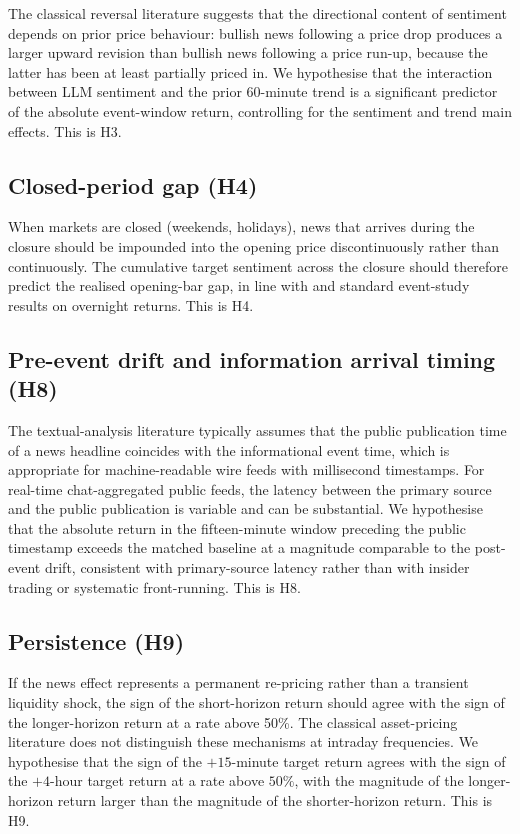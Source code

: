 The classical reversal literature \citep{tetlock2007giving} suggests
that the directional content of sentiment depends on prior price
behaviour: bullish news following a price drop produces a larger
upward revision than bullish news following a price run-up, because
the latter has been at least partially priced in. We hypothesise
that the interaction between LLM sentiment and the prior 60-minute
trend is a significant predictor of the absolute event-window
return, controlling for the sentiment and trend main effects. This
is H3.

\subsection{Closed-period gap (H4)}

When markets are closed (weekends, holidays), news that arrives
during the closure should be impounded into the opening price
discontinuously rather than continuously. The cumulative target
sentiment across the closure should therefore predict the realised
opening-bar gap, in line with \citet{fama1970efficient} and standard
event-study results on overnight returns. This is H4.

\subsection{Pre-event drift and information arrival timing (H8)}

The textual-analysis literature typically assumes that the public
publication time of a news headline coincides with the
informational event time, which is appropriate for
machine-readable wire feeds with millisecond timestamps. For
real-time chat-aggregated public feeds, the latency between the
primary source and the public publication is variable and can be
substantial. We hypothesise that the absolute return in the
fifteen-minute window preceding the public timestamp exceeds the
matched baseline at a magnitude comparable to the post-event drift,
consistent with primary-source latency rather than with insider
trading or systematic front-running. This is H8.

\subsection{Persistence (H9)}

If the news effect represents a permanent re-pricing rather than a
transient liquidity shock, the sign of the short-horizon return
should agree with the sign of the longer-horizon return at a rate
above 50\%. The classical asset-pricing literature
\citep{fama1970efficient,mackinlay1997event} does not distinguish
these mechanisms at intraday frequencies. We hypothesise that the
sign of the $+15$-minute target return agrees with the sign of the
$+4$-hour target return at a rate above $50\%$, with the magnitude
of the longer-horizon return larger than the magnitude of the
shorter-horizon return. This is H9.

